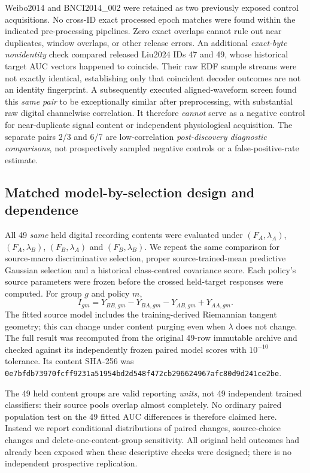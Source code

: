 Weibo2014 and BNCI2014\_002 were retained as
two previously exposed control acquisitions.
No cross-ID exact processed epoch matches were
found within the indicated pre-processing pipelines.
Zero exact overlaps cannot rule out near duplicates,
window overlaps, or other release errors.
An additional \emph{exact-byte nonidentity} check
compared released Liu2024 IDs 47 and 49, whose historical
target AUC vectors happened to coincide. Their raw EDF
sample streams were not exactly identical, establishing
only that coincident decoder outcomes are not an identity
fingerprint. A subsequently executed aligned-waveform
screen found this \emph{same pair} to be exceptionally
similar after preprocessing, with substantial raw digital
channelwise correlation. It therefore \emph{cannot}
serve as a negative control for near-duplicate signal
content or independent physiological acquisition.
The separate pairs 2/3 and 6/7 are low-correlation
\emph{post-discovery diagnostic comparisons}, not
prospectively sampled negative controls or a
false-positive-rate estimate.

\subsection{Matched model-by-selection design and dependence}
\label{sec:p2-analysis-units}
All 49 \emph{same} held digital recording contents
were evaluated under
$(F_A,\lambda_A)$, $(F_A,\lambda_B)$,
$(F_B,\lambda_A)$ and $(F_B,\lambda_B)$.
We repeat the same comparison for source-macro
discriminative selection, proper source-trained-mean
predictive Gaussian selection and a historical
class-centred covariance score. Each policy's source
parameters were frozen before the crossed held-target
responses were computed. For group $g$ and policy $m$,
\[
 I_{gm}=Y_{BB,gm}-Y_{BA,gm}-Y_{AB,gm}+Y_{AA,gm}.
\]
The fitted source model includes the training-derived
Riemannian tangent geometry; this can change under
content purging even when $\lambda$ does not change.
The full result was recomputed from the original
49-row immutable archive and checked against its
independently frozen paired model scores with
$10^{-10}$ tolerance. Its content SHA-256 was
\texttt{0e7bfdb73970\allowbreak fcff9231a519\allowbreak 54bd2d548f47\allowbreak 2cb296624967\allowbreak afc80d9d241c\allowbreak e2be}.

The 49 held content groups are valid reporting
\emph{units}, not 49 independent trained classifiers:
their source pools overlap almost completely.
No ordinary paired population test on the 49 fitted
AUC differences is therefore claimed here.
Instead we report conditional distributions of
paired changes, source-choice changes and
delete-one-content-group sensitivity.
All original held outcomes had already been
exposed when these descriptive checks were designed;
there is no independent prospective replication.
